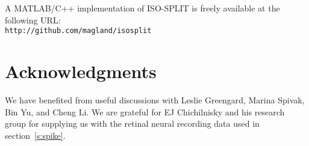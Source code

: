 \documentclass[10pt]{article}
\begin{document}
A MATLAB/C++ implementation of ISO-SPLIT is freely available
at the following URL:\\
{\tt http://github.com/magland/isosplit}


\section*{Acknowledgments}

We have benefited from useful discussions with Leslie Greengard,
Marina Spivak, Bin Yu, and Cheng Li.
We are grateful for EJ Chichilnisky and his research group
for supplying us with the retinal neural recording data used
in section~\ref{s:spike}.



\appendix %


\end{document}
